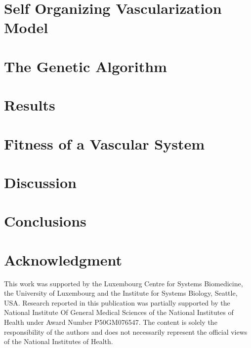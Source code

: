 \documentclass[conference]{IEEEtran}
\begin{document}


\section{Self Organizing Vascularization Model}



\section{The Genetic Algorithm}



\section{Results}



\section{Fitness of a Vascular System}
\label{fitnessFunction}



\section{Discussion}


\section{Conclusions}


\section*{Acknowledgment}

This work was supported by the Luxembourg Centre for Systems Biomedicine, the University of Luxembourg and the Institute for Systems Biology, Seattle, USA. Research reported in this publication was partially supported by the National Institute Of General Medical Sciences of the National Institutes of Health under Award Number P50GM076547. The content is solely the responsibility of the authors and does not necessarily represent the official views of the National Institutes of Health.



\begin{small}


\end{small}
\end{document}
